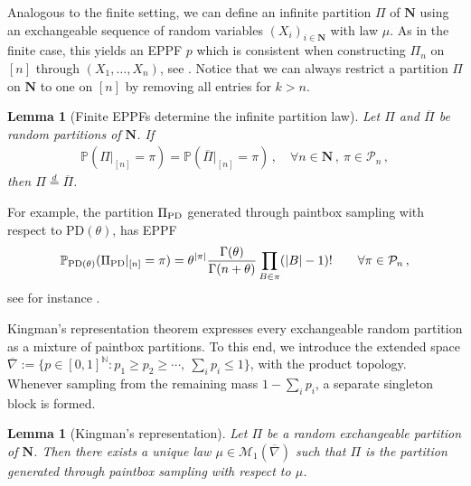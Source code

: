 \documentclass[a4paper,11pt]{article}
\newcommand{\NN}{\mathbf{N}}
\newcommand{\PP}{\mathbb{P}}
\newcommand{\mP}{\mathcal{P}}
\newcommand{\mM}{\mathcal{M}}
\numberwithin{equation}{section}
\newtheorem{lemma}[theorem]{Lemma}
\begin{document}
Analogous to the finite setting, we can define an infinite partition $ \Pi$ of $ \NN$ using an exchangeable sequence of random variables $ (X_{i})_{i \in \NN}$ with law $ \mu$. As in the finite case, this yields an EPPF $p$ which is consistent when constructing $ \Pi_{n}$ on $[n]$ through $ (X_{1}, \ldots, X_{n})$, see \cite[Section~2.2]{Pitman2006}.
Notice that we can always restrict a partition $ \Pi$ on $ \NN$ to one on $ [ n]$ by removing all entries for $k >n $.

\begin{lemma}[Finite EPPFs determine the infinite partition law]
\label{lem_fdd}
Let $\Pi$ and $ \overline{\Pi}$ be random partitions of
$\NN$. If
\begin{equation*}
\begin{aligned}
\PP ( \Pi |_{[n]} = \pi) = \PP ( \overline{\Pi} |_{[n]} = \pi)\,, \quad \forall n \in \NN\,, \ \pi \in \mP_{n}\,,
\end{aligned}
\end{equation*}
then $
\Pi\overset{d}{=}\overline{\Pi}$.
\end{lemma}


For example, the partition $ \Pi_{\rm PD}$ generated through paintbox sampling with respect to $ \mathrm{PD}( \theta) $, has EPPF 
\begin{equation}\label{eq_pd_part}
\begin{aligned}
\PP_{\mathrm{PD}(\theta)}( \Pi_{\rm PD } |_{[n]}= \pi)
= 
\theta^{|\pi|}
\frac{\Gamma ( \theta)}{ \Gamma( n+\theta)} 
\prod_{B \in \pi}(|B|-1)! \qquad \forall \pi \in \mP_{n}\,,
\end{aligned}
\end{equation}
see for instance \cite[Equations~(2.19)--(2.20)]{Pitman2006}.
\medskip

Kingman's representation theorem expresses every exchangeable
random partition as a mixture of paintbox partitions.
To this end, we introduce
the extended space
$\overline\nabla:=\{p\in[0,1]^{\mathbb N}:p_1\ge p_2\ge\cdots,\ \sum_i p_i\le1\}$,
 with the product topology.
Whenever sampling from the remaining mass $1-\sum_i p_i$,
a separate singleton block is formed.

\begin{lemma}[Kingman's representation]\label{lem_kingman}
Let $ \Pi$ be a random exchangeable partition of $ \NN$. Then there exists a unique law $ \mu \in \mM_{1}( \overline\nabla)$ such that $ \Pi$ is the partition generated through paintbox sampling with respect to $ \mu$.
\end{lemma}
\end{document}
